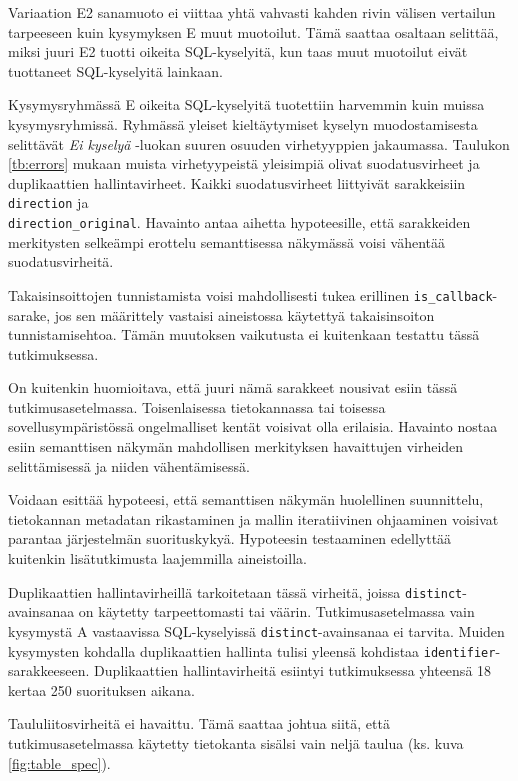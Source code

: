 Variaation E2 sanamuoto ei viittaa yhtä vahvasti kahden rivin
välisen vertailun tarpeeseen kuin kysymyksen E muut muotoilut.
Tämä saattaa osaltaan selittää, miksi juuri E2 tuotti oikeita
SQL-kyselyitä, kun taas muut muotoilut eivät tuottaneet SQL-kyselyitä
lainkaan.

Kysymysryhmässä E oikeita SQL-kyselyitä tuotettiin harvemmin kuin
muissa kysymysryhmissä. Ryhmässä yleiset kieltäytymiset kyselyn
muodostamisesta selittävät \textit{Ei kyselyä} -luokan suuren osuuden
virhetyyppien jakaumassa. Taulukon \ref{tb:errors} mukaan muista
virhetyypeistä yleisimpiä olivat suodatusvirheet ja duplikaattien
hallintavirheet. Kaikki suodatusvirheet liittyivät sarakkeisiin
\texttt{direction} ja \\ \texttt{direction\_original}. Havainto antaa
aihetta hypoteesille, että sarakkeiden merkitysten selkeämpi erottelu
semanttisessa näkymässä voisi vähentää suodatusvirheitä.

Takaisinsoittojen tunnistamista voisi mahdollisesti tukea erillinen
\texttt{is\_callback}-sarake, jos sen määrittely vastaisi aineistossa
käytettyä takaisinsoiton tunnistamisehtoa. Tämän muutoksen vaikutusta
ei kuitenkaan testattu tässä tutkimuksessa.

On kuitenkin huomioitava, että juuri nämä sarakkeet nousivat esiin tässä tutkimusasetelmassa. Toisenlaisessa tietokannassa tai toisessa sovellusympäristössä ongelmalliset kentät voisivat olla erilaisia. Havainto nostaa esiin semanttisen näkymän mahdollisen
merkityksen havaittujen virheiden selittämisessä ja niiden
vähentämisessä.

Voidaan esittää hypoteesi, että semanttisen näkymän huolellinen
suunnittelu, tietokannan metadatan rikastaminen ja mallin
iteratiivinen ohjaaminen voisivat parantaa järjestelmän
suorituskykyä. Hypoteesin testaaminen
edellyttää kuitenkin lisätutkimusta laajemmilla aineistoilla.

Duplikaattien hallintavirheillä tarkoitetaan tässä virheitä, joissa \texttt{distinct}-avain\-sanaa on käytetty tarpeettomasti tai väärin. Tutkimusasetelmassa vain kysymystä A vastaavissa SQL-kyselyissä \texttt{distinct}-avainsanaa ei tarvita. Muiden kysymysten kohdalla duplikaattien hallinta tulisi yleensä kohdistaa \texttt{identifier}-sarakkeeseen. Duplikaattien hallintavirheitä esiintyi tutkimuksessa yhteensä 18 kertaa 250 suorituksen aikana.

Taululiitosvirheitä ei havaittu. Tämä saattaa johtua siitä, että
tutkimusasetelmassa käytetty tietokanta sisälsi vain neljä taulua
(ks. kuva \ref{fig:table_spec}).

